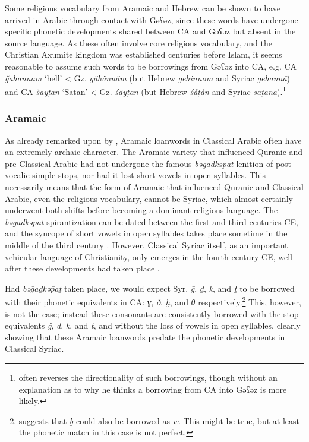 \documentclass[output=paper]{langsci/langscibook}
\begin{document}
Some religious vocabulary from Aramaic and Hebrew can be shown to have arrived in Arabic through contact with Gəʕəz, since these words have undergone specific phonetic developments shared between CA and Gəʕəz but absent in the source language. As these often involve core religious vocabulary, and the Christian Axumite kingdom was established centuries before Islam, it seems reasonable to assume such words to be borrowings from Gəʕəz into CA, e.g. CA \textit{ǧahannam} ‘hell’ < Gz. \textit{gähännäm} (but Hebrew \textit{gehinnom} and Syriac \textit{gehannā}) and CA \textit{šayṭān} ‘Satan’ < Gz. \textit{śäyṭan} (but Hebrew \textit{śåṭån} and Syriac \textit{sāṭānā}).\footnote{\citet{Leslau1990} often reverses the directionality of such borrowings, though without an explanation as to why he thinks a borrowing from CA into Gəʕəz is more likely.}

\subsubsection{\label{bkm:Ref13224460}Aramaic}

As already remarked upon by \citet{Retsö2011}, Aramaic loanwords in Classical Arabic often have an extremely archaic character. The Aramaic variety that influenced Quranic and pre-Classical Arabic had not undergone the famous \textit{bəḡaḏkəp̄aṯ} lenition of post-vocalic simple stops, nor had it lost short vowels in open syllables. This necessarily means that the form of Aramaic that influenced Quranic and Classical Arabic, even the religious vocabulary, cannot be Syriac, which almost certainly underwent both shifts before becoming a dominant religious language. The \textit{bəḡaḏkəp̄aṯ} spirantization can be dated between the first and third centuries CE, and the syncope of short vowels in open syllables takes place sometime in the middle of the third century \citep[41--42]{Gzella2015}. However, Classical Syriac itself, as an important vehicular language of Christianity, only emerges in the fourth century CE, well after these developments had taken place \citep[259]{Gzella2015}.

Had \textit{bəḡaḏkəp̄aṯ} taken place, we would expect Syr. \textit{ḡ}, \textit{ḏ}, \textit{ḵ}, and \textit{ṯ} to be borrowed with their phonetic equivalents in CA: \textit{ɣ}, \textit{ð}, \textit{ḫ}, and \textit{θ} respectively.\footnote{\cite{Retsö2011} suggests that \textit{ḇ} could also be borrowed as \textit{w}. This might be true, but at least the phonetic match in this case is not perfect.} This, however, is not the case; instead these consonants are consistently borrowed with the stop equivalents \textit{ǧ}, \textit{d}, \textit{k}, and \textit{t}, and without the loss of vowels in open syllables, clearly showing that these Aramaic loanwords predate the phonetic developments in Classical Syriac.
\end{document}
